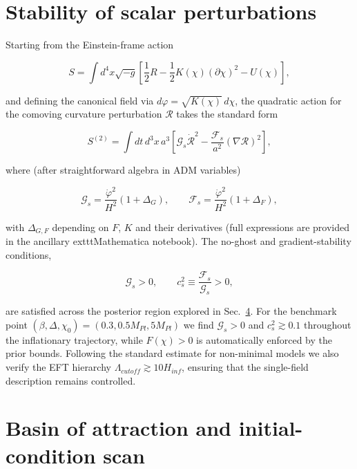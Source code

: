 \documentclass[
]{article}
\begin{document}

\section{Stability of scalar
perturbations}\label{stability-of-scalar-perturbations}

Starting from the Einstein-frame action

\[
S = \int d^{4}x\sqrt{- g}\left\lbrack \frac{1}{2}R - \frac{1}{2}K(\chi)(\partial\chi)^{2} - U(\chi) \right\rbrack,
\]

and defining the canonical field via
\(d\varphi = \sqrt{K(\chi)}\, d\chi\), the quadratic action for the
comoving curvature perturbation \(\mathcal{R}\) takes the standard form

\[
S^{(2)} = \int dt\, d^{3}x\, a^{3}\left\lbrack \mathcal{G}_{s}{\dot{\mathcal{R}}}^{2} - \frac{\mathcal{F}_{s}}{a^{2}}(\nabla\mathcal{R})^{2} \right\rbrack,
\]

where (after straightforward algebra in ADM variables)

\[
\mathcal{G}_{s} = \frac{{\dot{\varphi}}^{2}}{H^{2}}\left( 1 + \Delta_{G} \right),\quad\quad\mathcal{F}_{s} = \frac{{\dot{\varphi}}^{2}}{H^{2}}\left( 1 + \Delta_{F} \right),
\]

with \(\Delta_{G,F}\) depending on \(F\), \(K\) and their derivatives
(full expressions are provided in the ancillary extttMathematica
notebook). The no-ghost and gradient-stability conditions,

\[
\mathcal{G}_{s} > 0,\quad\quad c_{s}^{2} \equiv \frac{\mathcal{F}_{s}}{\mathcal{G}_{s}} > 0,
\]

are satisfied across the posterior region explored in
Sec.~\hyperref[sec:inflationary-observables]{4}. For the benchmark point
\((\beta,\Delta,\chi_{0}) = (0.3,0.5M_{Pl},5M_{Pl})\) we find
\(\mathcal{G}_{s} > 0\) and \(c_{s}^{2} \gtrsim 0.1\) throughout the
inflationary trajectory, while \(F(\chi) > 0\) is automatically enforced
by the prior bounds. Following the standard estimate for non-minimal
models we also verify the EFT hierarchy
\(\Lambda_{cutoff} \gtrsim 10H_{inf}\), ensuring that the single-field
description remains controlled.

\section{Basin of attraction and initial-condition
scan}\label{basin-of-attraction-and-initial-condition-scan}
\end{document}
